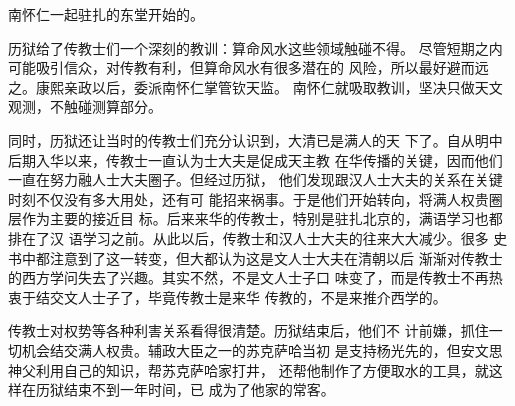 南怀仁一起驻扎的东堂开始的。%
\par
历狱给了传教士们一个深刻的教训：算命风水这些领域触碰不得。%
尽管短期之内可能吸引信众，对传教有利，但算命风水有很多潜在的%
风险，所以最好避而远之。康熙亲政以后，委派南怀仁掌管钦天监。%
南怀仁就吸取教训，坚决只做天文观测，不触碰测算部分。%
\par
同时，历狱还让当时的传教士们充分认识到，大清已是满人的天%
下了。自从明中后期入华以来，传教士一直认为士大夫是促成天主教%
在华传播的关键，因而他们一直在努力融人士大夫圈子。但经过历狱，%
他们发现跟汉人士大夫的关系在关键时刻不仅没有多大用处，还有可%
能招来祸事。于是他们开始转向，将满人权贵圈层作为主要的接近目%
标。后来来华的传教士，特别是驻扎北京的，满语学习也都排在了汉%
语学习之前。从此以后，传教士和汉人士大夫的往来大大减少。很多%
史书中都注意到了这一转变，但大都认为这是文人士大夫在清朝以后%
渐渐对传教士的西方学问失去了兴趣。其实不然，不是文人士子口%
味变了，而是传教士不再热衷于结交文人士子了，毕竟传教士是来华%
传教的，不是来推介西学的。%
\par
传教士对权势等各种利害关系看得很清楚。历狱结束后，他们不%
计前嫌，抓住一切机会结交满人权贵。辅政大臣之一的苏克萨哈当初%
是支持杨光先的，但安文思神父利用自己的知识，帮苏克萨哈家打井，%
还帮他制作了方便取水的工具，就这样在历狱结束不到一年时间，已%
成为了他家的常客。%
